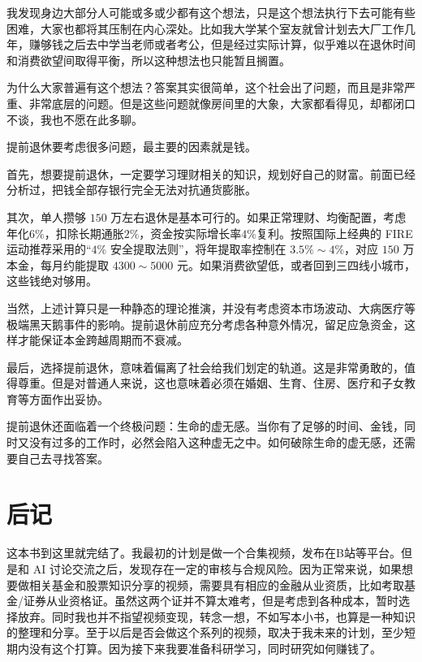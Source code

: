 \documentclass[12pt,openany]{book}
\begin{document}
我发现身边大部分人可能或多或少都有这个想法，只是这个想法执行下去可能有些困难，大家也都将其压制在内心深处。比如我大学某个室友就曾计划去大厂工作几年，赚够钱之后去中学当老师或者考公，但是经过实际计算，似乎难以在退休时间和消费欲望间取得平衡，所以这种想法也只能暂且搁置。

为什么大家普遍有这个想法？答案其实很简单，这个社会出了问题，而且是非常严重、非常底层的问题。但是这些问题就像房间里的大象，大家都看得见，却都闭口不谈，我也不愿在此多聊。

提前退休要考虑很多问题，最主要的因素就是钱。

首先，想要提前退休，一定要学习理财相关的知识，规划好自己的财富。前面已经分析过，把钱全部存银行完全无法对抗通货膨胀。

其次，单人攒够 $150$ 万左右退休是基本可行的。如果正常理财、均衡配置，考虑年化$6\%$，扣除长期通胀$2\%$，资金按实际增长率$4\%$复利。按照国际上经典的 FIRE 运动推荐采用的“$4\%$ 安全提取法则”，将年提取率控制在 $3.5\%\sim 4\%$，对应 $150$ 万本金，每月约能提取 $4300\sim 5000$ 元。如果消费欲望低，或者回到三四线小城市，这些钱绝对够用。

当然，上述计算只是一种静态的理论推演，并没有考虑资本市场波动、大病医疗等极端黑天鹅事件的影响。提前退休前应充分考虑各种意外情况，留足应急资金，这样才能保证本金跨越周期而不衰减。

最后，选择提前退休，意味着偏离了社会给我们划定的轨道。这是非常勇敢的，值得尊重。但是对普通人来说，这也意味着必须在婚姻、生育、住房、医疗和子女教育等方面作出妥协。

提前退休还面临着一个终极问题：生命的虚无感。当你有了足够的时间、金钱，同时又没有过多的工作时，必然会陷入这种虚无之中。如何破除生命的虚无感，还需要自己去寻找答案。



\backmatter
\chapter*{后记}

这本书到这里就完结了。我最初的计划是做一个合集视频，发布在B站等平台。但是和 AI 讨论交流之后，发现存在一定的审核与合规风险。因为正常来说，如果想要做相关基金和股票知识分享的视频，需要具有相应的金融从业资质，比如考取基金/证券从业资格证。虽然这两个证并不算太难考，但是考虑到各种成本，暂时选择放弃。同时我也并不指望视频变现，转念一想，不如写本小书，也算是一种知识的整理和分享。至于以后是否会做这个系列的视频，取决于我未来的计划，至少短期内没有这个打算。因为接下来我要准备科研学习，同时研究如何赚钱了。
\end{document}
